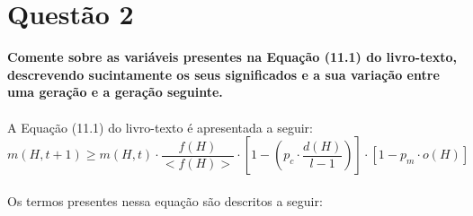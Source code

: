 \documentclass{report}
\begin{document}
\section*{Questão 2}

\textbf{Comente sobre as variáveis presentes na Equação (11.1) do livro-texto, descrevendo sucintamente os seus significados e a sua variação entre uma geração e a geração seguinte.}

\paragraph{} A Equação (11.1) do livro-texto é apresentada a seguir:\\

\begin{equation*}
m(H, t+1) \geq m(H,t) \cdot \frac{f(H)}{<f(H)>} \cdot \left[1 - \left(p_c \cdot \frac{d(H)}{l-1}\right)\right] \cdot [1 - p_m \cdot o(H)]
\end{equation*}

\paragraph{} Os termos presentes nessa equação são descritos a seguir:\\
\end{document}
